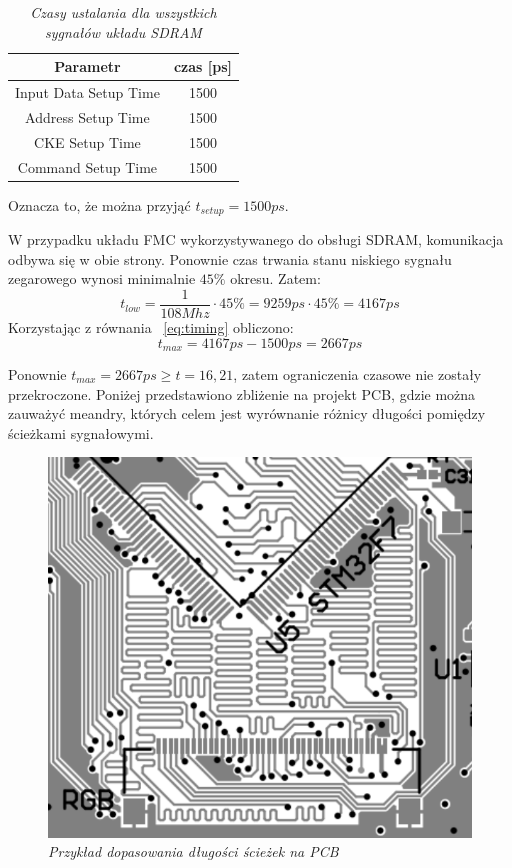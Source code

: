 \documentclass[eng,printmode]{mgr}
\begin{document}
\begin{table}[htb]
\def\arraystretch{1.3}%
\caption{\textit{ Czasy ustalania dla wszystkich sygnałów układu SDRAM}}
\label{tab:sdramTiming}
\begin{center}
\begin{tabular}{ |c|c| }
\hline
Parametr  & czas [ps] \\ 
\hline
Input Data Setup Time & 1500 \\ 
\hline
Address Setup Time & 1500\\ 
\hline
CKE Setup Time	 & 1500\\ 
\hline
Command Setup Time	 & 1500\\ 
\hline
\end{tabular}
\end{center}
\end{table}

\noindent
Oznacza to, że można przyjąć $t_{setup}=1500ps$.

W przypadku układu FMC wykorzystywanego do obsługi SDRAM, komunikacja odbywa się w obie strony. Ponownie czas trwania stanu niskiego sygnału zegarowego wynosi minimalnie $45\%$ okresu. Zatem:
$$
t_{low} = \frac{1}{108Mhz} \cdot 45\% = 9259ps\cdot45\% = 4167ps
$$
Korzystając z równania ~\ref{eq:timing} obliczono:
$$
t_{max} = 4167ps - 1500ps = 2667ps
$$

Ponownie $t_{max}= 2667ps \geq t=16,21$, zatem ograniczenia czasowe nie zostały przekroczone.
Poniżej przedstawiono zbliżenie na projekt PCB, gdzie można zauważyć meandry, których celem jest wyrównanie różnicy długości pomiędzy ścieżkami sygnałowymi.

\begin{figure}[!h]
    \centering
    \includegraphics[width=13cm]{pcb/ltdc.png}
    \caption{\textit{Przykład dopasowania długości ścieżek na PCB}}
\end{figure}
\end{document}
